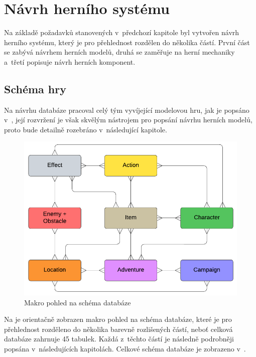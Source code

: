 \chapter{Návrh herního systému}
\label{chap:design}

Na základě požadavků stanovených v~předchozí kapitole  byl vytvořen návrh herního systému, který je pro přehlednost rozdělen do několika částí. První část se zabývá návrhem herních modelů, druhá se zaměřuje na herní mechaniky a~třetí popisuje návrh herních komponent.


\section{Schéma hry}
\label{sec:design_scheme}

Na návrhu databáze pracoval celý tým vyvíjející modelovou hru, jak je popsáno v~, její rozvržení je však skvělým nástrojem pro popsání návrhu herních modelů, proto bude detailně rozebráno v~následující kapitole.

\begin{figure}[h]
    \centering
    \includegraphics[scale=0.9]{../../shared/diagrams/er_macro.pdf}
    \caption{Makro pohled na schéma databáze}
    \label{diag:er_macro}
\end{figure}

Na  je orientačně zobrazen makro pohled na schéma databáze, které je pro přehlednost rozděleno do několika barevně rozlišených částí, neboť celková databáze zahrnuje 45 tabulek. Každá z~těchto částí je následně podrobněji popsána v~následujících kapitolách. Celkové schéma databáze je zobrazeno v~.


